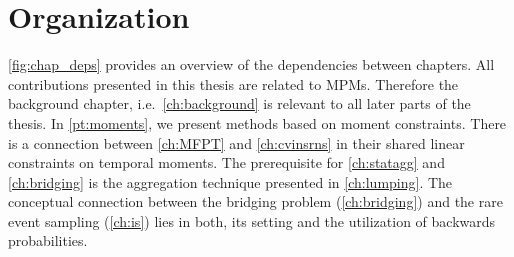 \section{Organization}
\autoref{fig:chap_deps} provides an overview of the dependencies
between chapters.
All contributions presented in this thesis are related to \aclp{MPM}.
Therefore the background chapter, i.e.\ \autoref{ch:background} is relevant
to all later parts of the thesis.
In \autoref{pt:moments}, we present methods based on moment constraints.
There is a connection between \autoref{ch:MFPT} and
\autoref{ch:cvinsrns} in their shared linear constraints on temporal moments.
The prerequisite for \autoref{ch:statagg} and \autoref{ch:bridging}
is the aggregation
technique presented in \autoref{ch:lumping}.
The conceptual connection between the bridging problem
(\autoref{ch:bridging}) and the rare event sampling (\autoref{ch:is})
lies in both, its setting and the utilization of backwards probabilities.
